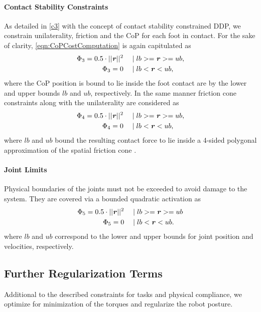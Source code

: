 \paragraph{Contact Stability Constraints}
As detailed in \ref{c3} with the concept of contact stability constrained \gls{DDP}, we constrain unilaterality, friction and the \gls{CoP} for each foot in contact. For the sake of clarity, \cref{eqn:CoPCostComputation} is again capitulated as 
\begin{align*}
\begin{split}
\Phi_3 = 0.5 \cdot ||\bm{\mathit{r}}||^2 \quad &\mid lb >= \bm{\mathit{r}} >= ub, \\
\Phi_3 = 0 \quad &\mid lb < \bm{\mathit{r}} < ub,
\end{split}
\end{align*}
where the \gls{CoP} position is bound to lie inside the foot contact are by the lower and upper bounds $lb$ and $ub$, respectively.
In the same manner friction cone constraints along with the unilaterality are considered as
\begin{align*}
\begin{split}
\Phi_4 = 0.5 \cdot ||\bm{\mathit{r}}||^2 \quad &\mid lb >= \bm{\mathit{r}} >= ub, \\
\Phi_4 = 0 \quad &\mid lb < \bm{\mathit{r}} < ub,
\end{split}
\end{align*}
where $lb$ and $ub$ bound the resulting contact force to lie inside a 4-sided polygonal approximation of the spatial friction cone \cite{kao2016contact}.

\paragraph{Joint Limits}
Physical boundaries of the joints must not be exceeded to avoid damage to the system. They are covered via a bounded quadratic activation as
\begin{align*}
\begin{split}
\Phi_5 = 0.5 \cdot ||\bm{\mathit{r}}||^2 \quad &\mid lb >= \bm{\mathit{r}} >= ub \\
\Phi_5 = 0 \quad &\mid lb < \bm{\mathit{r}} < ub.
\end{split}
\end{align*}
where $lb$ and $ub$ correspond to the lower and upper bounds for joint position and velocities, respectively. 

\subsection{Further Regularization Terms}
Additional to the described constraints for tasks and physical compliance, we optimize for minimization of the torques and regularize the robot posture.
